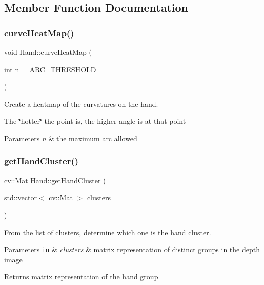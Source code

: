 \subsection{Member Function Documentation}
\hypertarget{class_hand_ae3d90ae264631ad6af2efbb5baddfda6}{}\label{class_hand_ae3d90ae264631ad6af2efbb5baddfda6} 
\subsubsection{\texorpdfstring{curve\+Heat\+Map()}{curveHeatMap()}}
{\footnotesize\ttfamily void Hand\+::curve\+Heat\+Map (\begin{DoxyParamCaption}\item[{int}]{n = {\ttfamily ARC\+\_\+THRESHOLD} }\end{DoxyParamCaption})\hspace{0.3cm}{\ttfamily [protected]}}



Create a heatmap of the curvatures on the hand. 

The \char`\"{}hotter\char`\"{} the point is, the higher angle is at that point 
\begin{DoxyParams}{Parameters}
{\em n} & the maximum arc allowed \\
\hline
\end{DoxyParams}
\hypertarget{class_hand_aa3ada30b516302dbabe5813f8eb6ac1a}{}\label{class_hand_aa3ada30b516302dbabe5813f8eb6ac1a} 
\subsubsection{\texorpdfstring{get\+Hand\+Cluster()}{getHandCluster()}}
{\footnotesize\ttfamily cv\+::\+Mat Hand\+::get\+Hand\+Cluster (\begin{DoxyParamCaption}\item[{std\+::vector$<$ cv\+::\+Mat $>$}]{clusters }\end{DoxyParamCaption})\hspace{0.3cm}{\ttfamily [static]}}



From the list of clusters, determine which one is the hand cluster. 


\begin{DoxyParams}[1]{Parameters}
\mbox{\tt in}  & {\em clusters} & matrix representation of distinct groups in the depth image \\
\hline
\end{DoxyParams}
\begin{DoxyReturn}{Returns}
matrix representation of the hand group 
\end{DoxyReturn}
\hypertarget{class_hand_a3c9f87cf116838082875016e459127ae}{}\label{class_hand_a3c9f87cf116838082875016e459127ae} 
